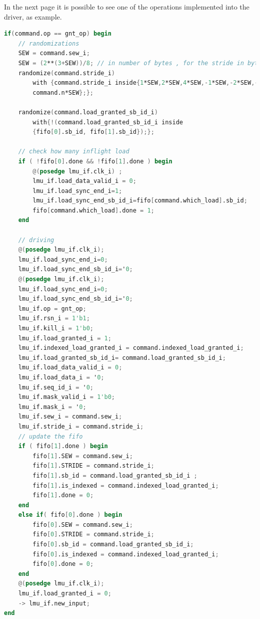 In the next page it is possible to see one of the operations implemented into the driver, as example.
\newpage
\linespread{1}
\begin{lstlisting}[language=Verilog,style=verilog-style, backgroundcolor=\color{lyel_palette}, frame=tlb]
if(command.op == gnt_op) begin
    // randomizations
    SEW = command.sew_i;
    SEW = (2**(3+SEW))/8; // in number of bytes , for the stride in bytes
    randomize(command.stride_i) 
        with {command.stride_i inside{1*SEW,2*SEW,4*SEW,-1*SEW,-2*SEW,-4*SEW,
        command.n*SEW};};

    randomize(command.load_granted_sb_id_i) 
        with{!(command.load_granted_sb_id_i inside
        {fifo[0].sb_id, fifo[1].sb_id});};

    // check how many inflight load
    if ( !fifo[0].done && !fifo[1].done ) begin
	    @(posedge lmu_if.clk_i) ;
	    lmu_if.load_data_valid_i = 0;
	    lmu_if.load_sync_end_i=1;
	    lmu_if.load_sync_end_sb_id_i=fifo[command.which_load].sb_id;	
	    fifo[command.which_load].done = 1;
    end 

    // driving
    @(posedge lmu_if.clk_i);
    lmu_if.load_sync_end_i=0;
    lmu_if.load_sync_end_sb_id_i='0;
    @(posedge lmu_if.clk_i);
    lmu_if.load_sync_end_i=0;
    lmu_if.load_sync_end_sb_id_i='0;
    lmu_if.op = gnt_op;
    lmu_if.rsn_i = 1'b1;
    lmu_if.kill_i = 1'b0;
    lmu_if.load_granted_i = 1;
    lmu_if.indexed_load_granted_i = command.indexed_load_granted_i;
    lmu_if.load_granted_sb_id_i= command.load_granted_sb_id_i;
    lmu_if.load_data_valid_i = 0;
    lmu_if.load_data_i = '0;
    lmu_if.seq_id_i = '0;
    lmu_if.mask_valid_i = 1'b0;
    lmu_if.mask_i = '0;
    lmu_if.sew_i = command.sew_i;     
    lmu_if.stride_i = command.stride_i;
    // update the fifo
    if ( fifo[1].done ) begin
	    fifo[1].SEW = command.sew_i;
	    fifo[1].STRIDE = command.stride_i;
	    fifo[1].sb_id = command.load_granted_sb_id_i ;
	    fifo[1].is_indexed = command.indexed_load_granted_i;
	    fifo[1].done = 0;
    end
    else if( fifo[0].done ) begin
	    fifo[0].SEW = command.sew_i;
	    fifo[0].STRIDE = command.stride_i;
	    fifo[0].sb_id = command.load_granted_sb_id_i;
	    fifo[0].is_indexed = command.indexed_load_granted_i;
	    fifo[0].done = 0;
    end
    @(posedge lmu_if.clk_i);
    lmu_if.load_granted_i = 0;
    -> lmu_if.new_input;
end




\end{lstlisting}
\linespread{1.2}
\newpage


